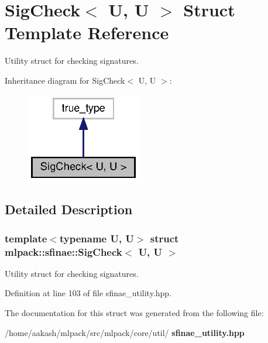 \section{Sig\+Check$<$ U, U $>$ Struct Template Reference}
\label{structmlpack_1_1sfinae_1_1SigCheck}


Utility struct for checking signatures.  




Inheritance diagram for Sig\+Check$<$ U, U $>$\+:
\nopagebreak
\begin{figure}[H]
\begin{center}
\leavevmode
\includegraphics[width=142pt]{structmlpack_1_1sfinae_1_1SigCheck__inherit__graph}
\end{center}
\end{figure}


\subsection{Detailed Description}
\subsubsection*{template$<$typename U, U$>$\newline
struct mlpack\+::sfinae\+::\+Sig\+Check$<$ U, U $>$}

Utility struct for checking signatures. 

Definition at line 103 of file sfinae\+\_\+utility.\+hpp.



The documentation for this struct was generated from the following file\+:\begin{DoxyCompactItemize}
\item 
/home/aakash/mlpack/src/mlpack/core/util/\textbf{ sfinae\+\_\+utility.\+hpp}\end{DoxyCompactItemize}
